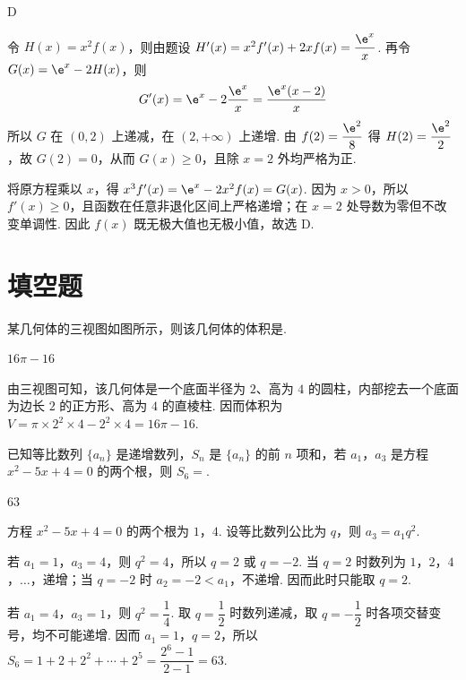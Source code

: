 \begin{answer}
D
\end{answer}

\begin{solution}
令 \(H(x)=x^2f(x)\)，则由题设
\(H'(x)=x^2f'(x)+2xf(x)=\dfrac{\e^x}{x}\). 再令
\(G(x)=\e^x-2H(x)\)，则
\[
G'(x)=\e^x-2\frac{\e^x}{x}=\frac{\e^x(x-2)}{x}
\]
所以 \(G\) 在 \((0,2)\) 上递减，在 \((2,+\infty)\) 上递增. 由 \(f(2)=\dfrac{\e^2}{8}\) 得 \(H(2)=\dfrac{\e^2}{2}\)，故 \(G(2)=0\)，从而 \(G(x)\geqslant0\)，且除 \(x=2\) 外均严格为正.

将原方程乘以 \(x\)，得 \(x^3f'(x)=\e^x-2x^2f(x)=G(x)\). 因为 \(x>0\)，所以 \(f'(x)\geqslant0\)，且函数在任意非退化区间上严格递增；在 \(x=2\) 处导数为零但不改变单调性. 因此 \(f(x)\) 既无极大值也无极小值，故选 D.
\end{solution}

\section{填空题}

\begin{problem}
某几何体的三视图如图所示，则该几何体的体积是\fillinblank{}.

\end{problem}

\begin{answer}
\(16\pi - 16\)
\end{answer}

\begin{solution}
由三视图可知，该几何体是一个底面半径为 \(2\)、高为 \(4\) 的圆柱，内部挖去一个底面为边长 \(2\) 的正方形、高为 \(4\) 的直棱柱. 因而体积为
\(V=\pi\times2^2\times4-2^2\times4=16\pi-16\).
\end{solution}

\begin{problem}
已知等比数列 \(\{a_n\}\) 是递增数列，\(S_n\) 是 \(\{a_n\}\) 的前 \(n\) 项和，若 \(a_1\)，\(a_3\) 是方程 \(x^2 - 5x + 4 = 0\) 的两个根，则 \(S_6 =\)\fillinblank{}.
\end{problem}

\begin{answer}
\(63\)
\end{answer}

\begin{solution}
方程 \(x^2-5x+4=0\) 的两个根为 \(1\)，\(4\). 设等比数列公比为 \(q\)，则 \(a_3=a_1q^2\).

若 \(a_1=1\)，\(a_3=4\)，则 \(q^2=4\)，所以 \(q=2\) 或 \(q=-2\). 当 \(q=2\) 时数列为 \(1\)，\(2\)，\(4\)，\(\ldots\)，递增；当 \(q=-2\) 时 \(a_2=-2<a_1\)，不递增. 因而此时只能取 \(q=2\).

若 \(a_1=4\)，\(a_3=1\)，则 \(q^2=\dfrac14\). 取 \(q=\dfrac12\) 时数列递减，取 \(q=-\dfrac12\) 时各项交替变号，均不可能递增. 因而 \(a_1=1\)，\(q=2\)，所以
\(S_6=1+2+2^2+\cdots+2^5=\dfrac{2^6-1}{2-1}=63\).
\end{solution}

